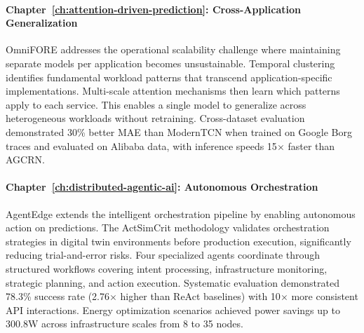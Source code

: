 \paragraph{Chapter~\ref{ch:attention-driven-prediction}: Cross-Application Generalization}
\ac{OmniFORE} addresses the operational scalability challenge where maintaining separate models per application becomes unsustainable. Temporal clustering identifies fundamental workload patterns that transcend application-specific implementations. Multi-scale attention mechanisms then learn which patterns apply to each service. This enables a single model to generalize across heterogeneous workloads without retraining. Cross-dataset evaluation demonstrated 30\% better \ac{MAE} than \ac{ModernTCN} when trained on Google Borg traces and evaluated on Alibaba data, with inference speeds 15$\times$ faster than \ac{AGCRN}.

\paragraph{Chapter~\ref{ch:distributed-agentic-ai}: Autonomous Orchestration}
\ac{AgentEdge} extends the intelligent orchestration pipeline by enabling autonomous action on predictions. The \ac{ActSimCrit} methodology validates orchestration strategies in digital twin environments before production execution, significantly reducing trial-and-error risks. Four specialized agents coordinate through structured workflows covering intent processing, infrastructure monitoring, strategic planning, and action execution. Systematic evaluation demonstrated 78.3\% success rate (2.76$\times$ higher than \ac{ReAct} baselines) with 10$\times$ more consistent \ac{API} interactions. Energy optimization scenarios achieved power savings up to 300.8W across infrastructure scales from 8 to 35 nodes.

